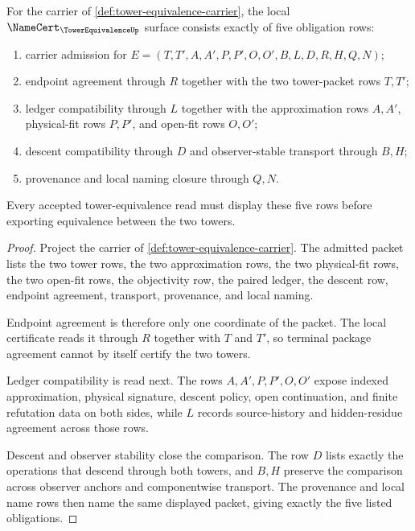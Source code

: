 \begin{theorem}
\label{thm:tower-equivalence-namecert-obligations}
For the carrier of \autoref{def:tower-equivalence-carrier}, the local $\NameCert_{\TowerEquivalenceUp}$ surface consists exactly of five obligation rows:
\begin{enumerate}
\item carrier admission for $E=(T,T',A,A',P,P',O,O',B,L,D,R,H,Q,N)$;
\item endpoint agreement through $R$ together with the two tower-packet rows $T,T'$;
\item ledger compatibility through $L$ together with the approximation rows $A,A'$, physical-fit rows $P,P'$, and open-fit rows $O,O'$;
\item descent compatibility through $D$ and observer-stable transport through $B,H$;
\item provenance and local naming closure through $Q,N$.
\end{enumerate}
Every accepted tower-equivalence read must display these five rows before exporting equivalence between the two towers.
\end{theorem}
\begin{proof}
Project the carrier of \autoref{def:tower-equivalence-carrier}. The admitted packet lists the two tower rows, the two approximation rows, the two physical-fit rows, the two open-fit rows, the objectivity row, the paired ledger, the descent row, endpoint agreement, transport, provenance, and local naming.

Endpoint agreement is therefore only one coordinate of the packet. The local certificate reads it through $R$ together with $T$ and $T'$, so terminal package agreement cannot by itself certify the two towers.

Ledger compatibility is read next. The rows $A,A',P,P',O,O'$ expose indexed approximation, physical signature, descent policy, open continuation, and finite refutation data on both sides, while $L$ records source-history and hidden-residue agreement across those rows.

Descent and observer stability close the comparison. The row $D$ lists exactly the operations that descend through both towers, and $B,H$ preserve the comparison across observer anchors and componentwise transport. The provenance and local name rows then name the same displayed packet, giving exactly the five listed obligations.
\end{proof}

